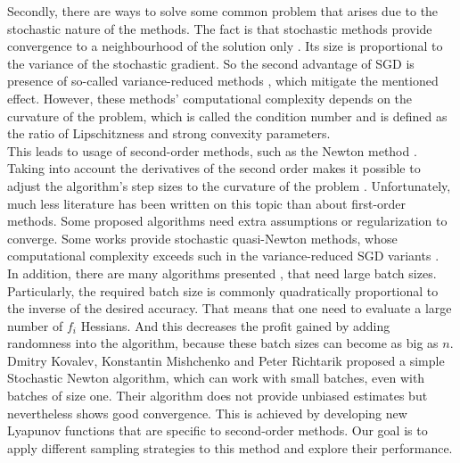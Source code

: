 \documentclass{article}
\begin{document}
	Secondly, there are ways to solve some common problem that arises due to the stochastic nature of the methods. The fact is that stochastic methods provide convergence to a neighbourhood of the solution only \cite{sgd-hogwild, sgd-general-analysis}. Its size is proportional to the variance of the stochastic gradient. So the second advantage of SGD is presence of so-called variance-reduced methods \cite{exp-convergence, advances-NIPS, unified-sgd, one-method}, which mitigate the mentioned effect. However, these methods' computational complexity depends on the curvature of the problem, which is called the condition number and is defined as the ratio of Lipschitzness and strong convexity parameters. \\
	
	This leads to usage of second-order methods, such as the Newton method \cite{Nesterov-introductory, Newton-convergence, RSN}. Taking into account the derivatives of the second order makes it possible to adjust the algorithm's step sizes to the curvature of the problem \cite{Nesterov-introductory}. Unfortunately, much less literature has been written on this topic than about first-order methods. Some proposed algorithms need extra assumptions \cite{Newton-convergence, RSN} or regularization \cite{cubic-regularization, randomized-cubic, uniform-convex-cubic} to converge. Some works \cite{proximal-quasi, lbfgs, stoch-bfgs} provide stochastic quasi-Newton methods, whose computational complexity exceeds such in the variance-reduced SGD variants \cite{advances-NIPS}. \\
	
	In addition, there are many algorithms presented \cite{sub-sampled, exact-inexact, variance-reduced-Newton, zhang2022adaptive, tripuraneni2018stochastic, zhou2020stochastic}, that need large batch sizes. Particularly, the required batch size is commonly quadratically proportional to the inverse of the desired accuracy. That means that one need to evaluate a large number of $f_i$ Hessians. And this decreases the profit gained by adding randomness into the algorithm, because these batch sizes can become as big as $n$. \\
	
	Dmitry Kovalev, Konstantin Mishchenko and Peter Richtarik proposed \cite{kovalev2019stochastic} a simple Stochastic Newton algorithm, which can work with small batches, even with batches of size one. Their algorithm does not provide unbiased estimates but nevertheless shows good convergence. This is achieved by developing new Lyapunov functions that are specific to second-order methods. Our goal is to apply different sampling strategies to this method and explore their performance. \\
	
\end{document}
